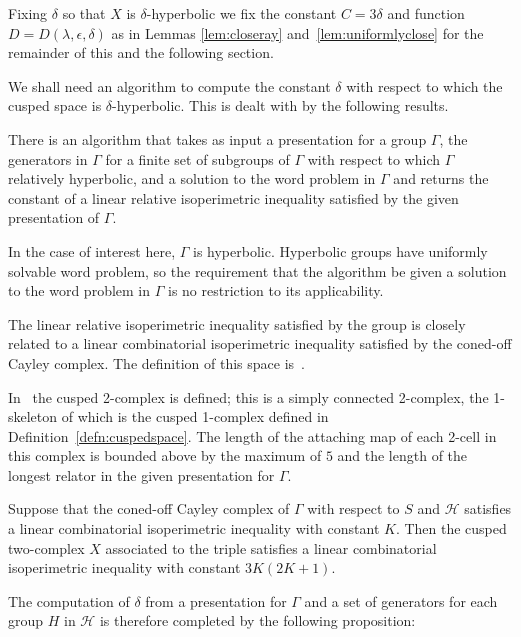 Fixing $\delta$ so that $X$ is $\delta$-hyperbolic we fix the constant $C =
3\delta$ and function $D = D(\lambda, \epsilon, \delta)$ as in Lemmas
\ref{lem:closeray} and~\ref{lem:uniformlyclose} for the remainder of this and
the following section.

We shall need an algorithm to compute the constant $\delta$ with respect to
which the cusped space is $\delta$-hyperbolic. This is dealt with by the
following results.

\begin{prop}\cite[Prop.\ 2.3]{dahmani08}
\label{thm:linearisoperimetricinequality} There is an algorithm that takes as
input a presentation for a group $\Gamma$, the generators in $\Gamma$ for a
finite set of subgroups of $\Gamma$ with respect to which $\Gamma$ relatively
hyperbolic, and a solution to the word problem in $\Gamma$ and returns the
constant of a linear relative isoperimetric inequality satisfied by the given
presentation of $\Gamma$.\end{prop}

In the case of interest here, $\Gamma$ is hyperbolic. Hyperbolic groups have
uniformly solvable word problem, so the requirement that the algorithm be given
a solution to the word problem in $\Gamma$ is no restriction to its
applicability.

The linear relative isoperimetric inequality satisfied by the group is closely
related to a linear combinatorial isoperimetric inequality satisfied by the
coned-off Cayley complex. The definition of this space 
is~\cite[Definition 2.47]{grovesmanning08}.

In~\cite{grovesmanning08} the cusped 2-complex is defined; this is a simply
connected 2-complex, the 1-skeleton of which is the cusped 1-complex defined
in Definition~\ref{defn:cuspedspace}. The length of the attaching map of each
2-cell in this complex is bounded above by the maximum of $5$ and the length of
the longest relator in the given presentation for $\Gamma$.

\begin{thm}\cite[Theorem 3.24]{grovesmanning08}\label{thm:cuspedtwocomplex}
Suppose that the coned-off Cayley complex of $\Gamma$ with respect to $S$ and
$\mathcal{H}$ satisfies a linear combinatorial isoperimetric inequality with
constant $K$. Then the cusped two-complex $X$ associated to the triple
satisfies a linear combinatorial isoperimetric inequality with constant $3K(2K
+ 1)$.\end{thm}

The computation of $\delta$ from a presentation for $\Gamma$ and a set of
generators for each group $H$ in $\mathcal{H}$ is therefore completed by the
following proposition:

